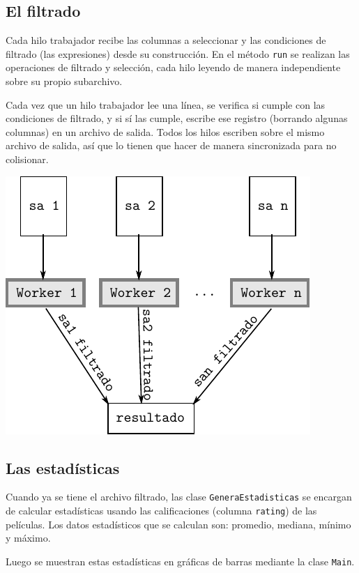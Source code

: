 \documentclass{article}
\begin{document}
\subsection{El filtrado}

Cada hilo trabajador recibe las columnas a seleccionar y las condiciones de filtrado (las expresiones) desde su construcción. En el método \texttt{run} se realizan las operaciones de filtrado y selección, cada hilo leyendo de manera independiente sobre su propio subarchivo.

Cada vez que un hilo trabajador lee una línea, se verifica si cumple con las condiciones de filtrado, y si sí las cumple, escribe ese registro (borrando algunas columnas) en un archivo de salida. Todos los hilos escriben sobre el mismo archivo de salida, así que lo tienen que hacer de manera sincronizada para no colisionar.

\begin{center}
\includegraphics[scale=1]{filtrado}
\end{center}

\subsection{Las estadísticas}

Cuando ya se tiene el archivo filtrado, las clase \texttt{GeneraEstadisticas} se encargan de calcular estadísticas usando las calificaciones (columna \texttt{rating}) de las películas. Los datos estadísticos que se calculan son: promedio, mediana, mínimo y máximo.

Luego se muestran estas estadísticas en gráficas de barras mediante la clase \texttt{Main}.
\end{document}
